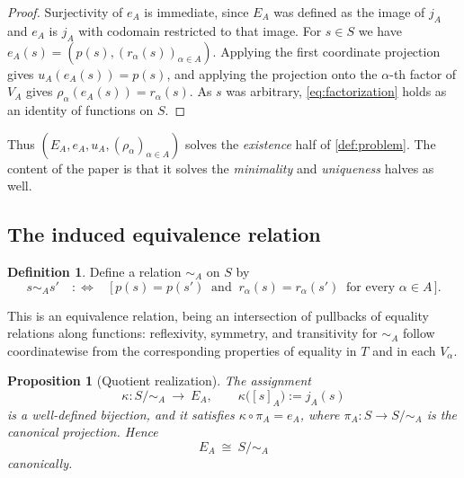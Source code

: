 \documentclass[11pt,reqno]{amsart}
\theoremstyle{plain}
\newtheorem{proposition}[theorem]{Proposition}
\theoremstyle{definition}
\newtheorem{definition}[theorem]{Definition}
\theoremstyle{remark}
\numberwithin{equation}{section}
\begin{document}
\begin{proof}
Surjectivity of $e_A$ is immediate, since $E_A$ was defined as the image of $j_A$ and $e_A$ is $j_A$
with codomain restricted to that image. For $s\in S$ we have
$e_A(s)=(p(s),(r_\alpha(s))_{\alpha\in A})$. Applying the first coordinate projection gives
$u_A(e_A(s))=p(s)$, and applying the projection onto the $\alpha$-th factor of $V_A$ gives
$\rho_\alpha(e_A(s))=r_\alpha(s)$. As $s$ was arbitrary, \eqref{eq:factorization} holds as an
identity of functions on $S$.
\end{proof}

Thus $(E_A,e_A,u_A,(\rho_\alpha)_{\alpha\in A})$ solves the \emph{existence} half of
\cref{def:problem}. The content of the paper is that it solves the \emph{minimality} and
\emph{uniqueness} halves as well.

\subsection{The induced equivalence relation}

\begin{definition}
\label{def:simA}
Define a relation $\sim_A$ on $S$ by
\begin{equation}
\label{eq:simA}
s\sim_A s'
\quad:\Longleftrightarrow\quad
\bigl[\,p(s)=p(s')\ \text{ and }\ r_\alpha(s)=r_\alpha(s')\ \text{ for every }\alpha\in A\,\bigr].
\end{equation}
\end{definition}

This is an equivalence relation, being an intersection of pullbacks of equality relations along
functions: reflexivity, symmetry, and transitivity for $\sim_A$ follow coordinatewise from the
corresponding properties of equality in $T$ and in each $V_\alpha$.

\begin{proposition}[Quotient realization]
\label{prop:quotient}
The assignment
\begin{equation}
\label{eq:kappa}
\kappa\colon S/\!\sim_A\ \longrightarrow\ E_A,
\qquad
\kappa\bigl([s]_A\bigr):=j_A(s)
\end{equation}
is a well-defined bijection, and it satisfies $\kappa\circ\pi_A=e_A$, where
$\pi_A\colon S\to S/\!\sim_A$ is the canonical projection. Hence
\begin{equation}
\label{eq:EA-quotient}
E_A\ \cong\ S/\!\sim_A
\end{equation}
canonically.
\end{proposition}
\end{document}
